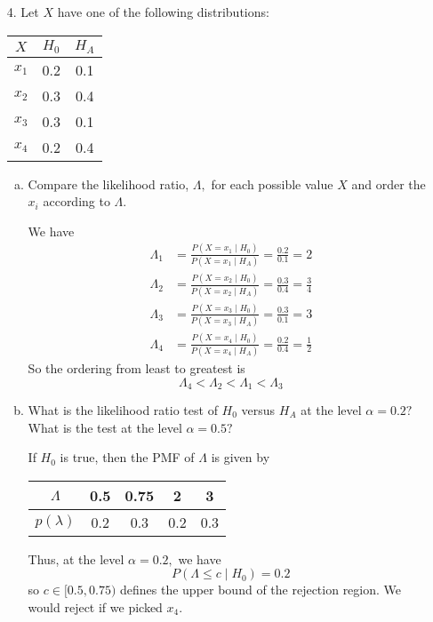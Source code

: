 \documentclass{article}
\begin{document}
\begin{itemize}
		\newpage
	\item[4.] Let $X$ have one of the following distributions:
		\begin{center}
			\begin{tabular}{ccc}
				$X$ & $H_0$ & $H_A$ \\
				\hline
				$x_1$ & 0.2 & 0.1 \\
				$x_2$ & 0.3 & 0.4 \\
				$x_3$ & 0.3 & 0.1 \\
				$x_4$ & 0.2 & 0.4
			\end{tabular}
		\end{center}

		\begin{enumerate}[a.]
			\item Compare the likelihood ratio, $\Lambda,$ for each possible value $X$ and order the $x_i$ according to $\Lambda.$
				\begin{soln}
					We have 
					\begin{align*}
						\Lambda_1 &= \frac{P(X=x_1\mid H_0)}{P(X=x_1\mid H_A)} = \frac{0.2}{0.1} = 2 \\
						\Lambda_2 &= \frac{P(X=x_2\mid H_0)}{P(X=x_2\mid H_A)}=\frac{0.3}{0.4}=\frac{3}{4} \\
						\Lambda_3 &= \frac{P(X=x_3\mid H_0)}{P(X=x_3\mid H_A)} = \frac{0.3}{0.1} = 3 \\
						\Lambda_4 &= \frac{P(X=x_4\mid H_0)}{P(X=x_4\mid H_A)} = \frac{0.2}{0.4}=\frac{1}{2}
					\end{align*}
					So the ordering from least to greatest is \[\Lambda_4<\Lambda_2<\Lambda_1<\Lambda_3\]
				\end{soln}

			\item What is the likelihood ratio test of $H_0$ versus $H_A$ at the level $\alpha=0.2?$ What is the test at the level $\alpha=0.5?$
				\begin{soln}
					If $H_0$ is true, then the PMF of $\Lambda$ is given by 
					\begin{center}
						\begin{tabular}{c||c|c|c|c}
							$\Lambda$ & 0.5 & 0.75 & 2 & 3 \\
							\hline
							$p(\lambda)$ & 0.2 & 0.3 & 0.2 & 0.3
						\end{tabular}
					\end{center}
					Thus, at the level $\alpha=0.2,$ we have \[P(\Lambda\le c \mid H_0) = 0.2\] so $c\in [0.5, 0.75)$ defines the upper bound of the rejection region. We would reject if we picked $x_4.$
						

\end{soln}
\end{enumerate}
\end{itemize}
\end{document}
